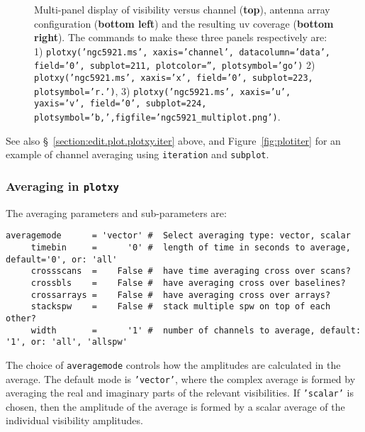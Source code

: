 \begin{figure}[h!]
\begin{center}
\caption{\label{fig:multiplot} Multi-panel display of visibility
  versus channel ({\bf top}), antenna array configuration ({\bf bottom left})
  and the resulting uv coverage ({\bf bottom right}). The commands to
  make these three panels respectively are: 
  1) {\tt plotxy('ngc5921.ms', xaxis='channel',
    datacolumn='data', field='0', subplot=211, plotcolor='',
    plotsymbol='go')}
  2) {\tt plotxy('ngc5921.ms', xaxis='x', field='0', subplot=223, plotsymbol='r.')}, 
  3) {\tt plotxy('ngc5921.ms', xaxis='u', yaxis='v', field='0',
    subplot=224, plotsymbol='b,',figfile='ngc5921\_multiplot.png')}.
  }
\hrulefill
\end{center}
\end{figure}

See also \S~\ref{section:edit.plot.plotxy.iter} above, and
Figure~\ref{fig:plotiter} for an example of channel 
averaging using {\tt iteration} and {\tt subplot}.
 
\subsubsection{Averaging in {\tt plotxy}}
\label{section:edit.plot.plotxy.average}

The averaging parameters and sub-parameters are:
\small
\begin{verbatim}
averagemode      = 'vector' #  Select averaging type: vector, scalar
     timebin     =      '0' #  length of time in seconds to average, default='0', or: 'all'
     crossscans  =    False #  have time averaging cross over scans?
     crossbls    =    False #  have averaging cross over baselines?
     crossarrays =    False #  have averaging cross over arrays?
     stackspw    =    False #  stack multiple spw on top of each other?
     width       =      '1' #  number of channels to average, default: '1', or: 'all', 'allspw'
\end{verbatim}
\normalsize

The choice of {\tt averagemode} controls how the amplitudes are calculated
in the average.  The default mode is {\tt 'vector'}, where the complex
average is formed by averaging the real and imaginary parts of the
relevant visibilities.  If {\tt 'scalar'} is chosen, then the
amplitude of the average is formed by a scalar average of the
individual visibility amplitudes.

